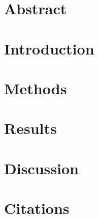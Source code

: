 \documentclass{article}
\begin{document}
\hypertarget{abstract}{%
\section{Abstract}\label{abstract}}

\label{sec:abstract}

\hypertarget{introduction}{%
\section{Introduction}\label{introduction}}

\hypertarget{methods}{%
\section{Methods}\label{methods}}

\label{sec:methods}

\hypertarget{results}{%
\section{Results}\label{results}}

\label{sec:results}

\hypertarget{discussion}{%
\section{Discussion}\label{discussion}}

\hypertarget{citations}{%
\section{Citations}\label{citations}}



\end{document}
